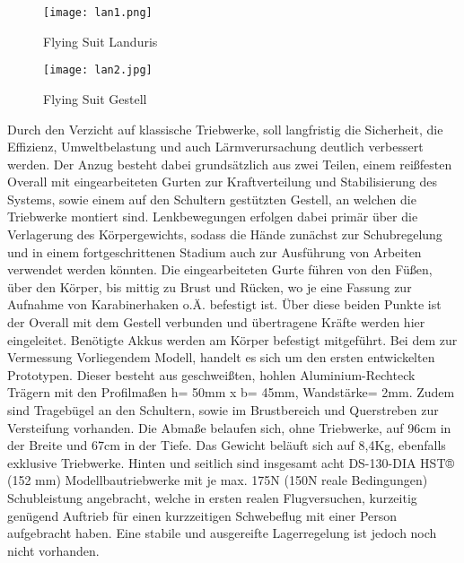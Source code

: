 \begin{figure}[htbp]
    \centering
    \begin{minipage}{0.48\textwidth}
        \centering
        \texttt{[image: lan1.png]}
        \caption[Flying Suit Landuris (Abbildungsverzeichnis)]{Flying Suit Landuris}
        \cite{Landuris}
        \label{fig:lan1}
    \end{minipage}
    \hfill
    \begin{minipage}{0.48\textwidth}
        \centering
        \texttt{[image: lan2.jpg]}
        \caption[Flying Suit Gestell (Abbildungsverzeichnis)]{Flying Suit Gestell}
        \cite{Landuris}

        \label{fig:lan2}
    \end{minipage}
\end{figure}

Durch den Verzicht auf klassische Triebwerke, soll langfristig die Sicherheit, die Effizienz, Umweltbelastung und auch Lärmverursachung deutlich verbessert werden.
Der Anzug besteht dabei grundsätzlich aus zwei Teilen, einem reißfesten Overall mit eingearbeiteten Gurten zur Kraftverteilung und Stabilisierung des Systems,
sowie einem auf den Schultern gestützten Gestell, an welchen die Triebwerke montiert sind. Lenkbewegungen erfolgen dabei primär über die Verlagerung des Körpergewichts,
sodass die Hände zunächst zur Schubregelung und in einem fortgeschrittenen Stadium auch zur Ausführung von Arbeiten verwendet werden könnten.
Die eingearbeiteten Gurte führen von den Füßen, über den Körper, bis mittig zu Brust und Rücken, wo je eine Fassung zur Aufnahme von Karabinerhaken o.Ä. befestigt ist.
Über diese beiden Punkte ist der Overall mit dem Gestell verbunden und übertragene Kräfte werden hier eingeleitet. Benötigte Akkus werden am Körper befestigt mitgeführt. 
Bei dem zur Vermessung Vorliegendem Modell, handelt es sich um den ersten entwickelten Prototypen.
Dieser besteht aus geschweißten, hohlen Aluminium-Rechteck Trägern mit den Profilmaßen h= 50mm x b= 45mm, Wandstärke= 2mm.
Zudem sind Tragebügel an den Schultern, sowie im Brustbereich und Querstreben zur Versteifung vorhanden.
Die Abmaße belaufen sich, ohne Triebwerke, auf 96cm in der Breite und 67cm in der Tiefe. Das Gewicht beläuft sich auf 8,4Kg, ebenfalls exklusive Triebwerke.
Hinten und seitlich sind insgesamt acht DS-130-DIA HST® (152 mm) Modellbautriebwerke mit je max. 175N (150N reale Bedingungen) Schubleistung angebracht,
welche in ersten realen Flugversuchen, kurzeitig genügend Auftrieb für einen kurzzeitigen Schwebeflug mit einer Person aufgebracht haben.
Eine stabile und ausgereifte Lagerregelung ist jedoch noch nicht vorhanden.

